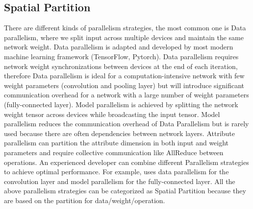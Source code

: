 \documentclass[sigplan]{acmart}\settopmatter{printfolios=true,printccs=false,printacmref=false}
\begin{document}
 \subsection{Spatial Partition}There are different kinds of parallelism strategies, the most common one is Data parallelism\cite{krizhevsky2012imagenet}, where we split input across multiple devices and maintain the same network weight. Data parallelism is adapted and developed by most modern machine learning framework (TensorFlow\cite{abadi2016tensorflow}, Pytorch\cite{paszke2019pytorch}). Data parallelism requires network weight synchronizations between devices at the end of each iteration, therefore Data parallelism is ideal for a computation-intensive network with few weight parameters (convolution and pooling layer) but will introduce significant communication overhead for a network with a large number of weight parameters (fully-connected layer). Model parallelism\cite{dean2012large} is achieved by splitting the network weight tensor across devices while broadcasting the input tensor. Model parallelism reduces the communication overhead of Data Parallelism but is rarely used because there are often dependencies between network layers. Attribute parallelism\cite{jia2019beyond} can partition the attribute dimension in both input and weight parameters and require collective communication like AllReduce between operations. An experienced developer can combine different Parallelism strategies to achieve optimal performance. For example, \cite{krizhevsky2014one} uses data parallelism for the convolution layer and model parallelism for the fully-connected layer. All the above parallelism strategies can be categorized as Spatial Partition because they are based on the partition for data/weight/operation. \par
\end{document}
